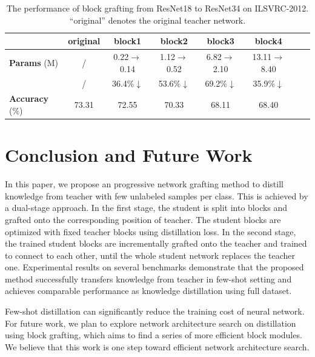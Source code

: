 \documentclass[letterpaper]{article} %
\begin{document}
{{{            
            \begin{table}[h]
            \centering
            \resizebox{\linewidth}{!}
            {
            \begin{tabular}{lccccccc}
            \hline
            \toprule
            & \textbf{original}    & \textbf{block1}    & \textbf{block2}   & \textbf{block3}  & \textbf{block4} \\ 
            \hline
            \textbf{Params} (M) &  / & 0.22$\rightarrow$0.14 & 1.12$\rightarrow$0.52 & 6.82$\rightarrow$2.10 & 13.11$\rightarrow$8.40\\
            &  / & 36.4\%$\downarrow$ & 53.6\%$\downarrow$ & 69.2\%$\downarrow$ & 35.9\%$\downarrow$ \\
            \hline
            \textbf{Accuracy} (\%) & 73.31             & 72.55              &  70.33            &  68.11          & 68.40  \\
            \bottomrule
            \end{tabular}
            }

            \caption{The performance of block grafting from ResNet18 to ResNet34 on ILSVRC-2012. 
            ``original'' denotes the original teacher network.
                    }
            \label{table:partial}
            \end{table}
        }
    }

}

\section{Conclusion and Future Work}
{
    In this paper, we propose an progressive network grafting method to distill knowledge from teacher with few unlabeled samples per class. 
    This is achieved by a dual-stage approach.
    In the first stage, the student is split into blocks and grafted onto the corresponding position of teacher.
    The student blocks are optimized with fixed teacher blocks using distillation loss.
    In the second stage, the trained student blocks are incrementally grafted onto the teacher and trained to connect to each other, until the whole student network replaces the teacher one.
    Experimental results on several benchmarks demonstrate that the proposed method successfully transfers knowledge from teacher in few-shot setting and achieves comparable performance as knowledge distillation using full dataset. 

    Few-shot distillation can significantly reduce the training cost of neural network.
    For future work, we plan to explore network architecture search on distillation using block grafting, which aims to find a series of more efficient block modules.
    We believe that this work is one step toward efficient network architecture search.

}
\end{document}
